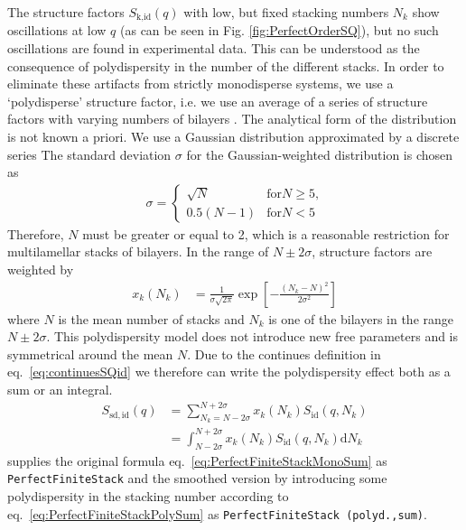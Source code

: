 The structure factors $S_\text{k,id}(q)$ with low, but fixed
stacking numbers $N_k$ show oscillations at low $q$ (as can be seen in
Fig. \ref{fig:PerfectOrderSQ}), but no such oscillations are found in
experimental data. This can be understood as the consequence of
polydispersity in the number of the different stacks. In order to
eliminate these artifacts from strictly monodisperse systems, we use
a `polydisperse' structure factor, i.e. we use an average of a
series of structure factors with varying numbers of bilayers
\cite{Fruhwirth2004}. The analytical form of the distribution is not
known a priori. We use a Gaussian distribution approximated by a
discrete series The standard deviation $\sigma$ for the
Gaussian-weighted distribution is chosen as
\begin{align}
\sigma =
\begin{cases}
\sqrt{N} & \text{for} N\geq 5 \text{,} \\
0.5(N-1) & \text{for} N< 5
\end{cases}
\end{align}
Therefore, $N$ must be greater or equal to 2, which is a
reasonable restriction for multilamellar stacks of bilayers. In
the range of $N \pm 2\sigma$, structure factors are weighted by
\begin{align}
x_k(N_k) & = \frac{1}{\sigma\sqrt{2\pi}} \exp\left[
-\frac{(N_k-N)^2}{2\sigma^2}\right]
\end{align}
where $N$ is the mean number of stacks and $N_k$
is one of the  bilayers in the range $N\pm 2\sigma$. This
polydispersity model does not introduce new free parameters and is
symmetrical around the mean $N$. Due to the continues definition in eq.\ \ref{eq:continuesSQid} we therefore can write the polydispersity effect both as a sum or an integral.
\begin{align}
  S_\mathrm{sd,id}(q) & = \sum_{N_k=N-2\sigma}^{N+2\sigma} x_k(N_k) S_\mathrm{id}(q,N_k) \label{eq:PerfectFiniteStackPolySum} \\
                      & = \int_{N-2\sigma}^{N+2\sigma} x_k(N_k) S_\mathrm{id}(q,N_k) \mathrm{d}N_k
\end{align}
\SASfit supplies the original formula eq.\ \ref{eq:PerfectFiniteStackMonoSum} as  \texttt{PerfectFiniteStack} and the smoothed version by introducing some polydispersity in the stacking number according to eq.\ \ref{eq:PerfectFiniteStackPolySum} as \texttt{PerfectFiniteStack (polyd.,sum)}.

\vspace{5mm}

